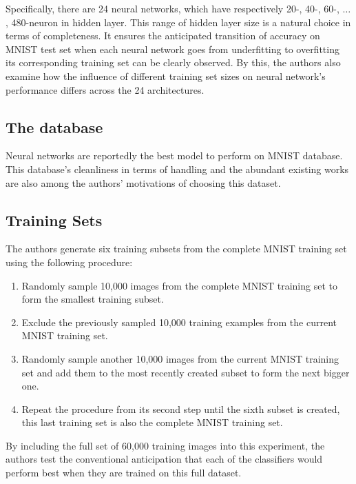 \documentclass[conference]{IEEEtran}
\begin{document}
Specifically, there are 24 neural networks, which have respectively 20-, 40-, 60-, $\ldots$, 480-neuron in hidden layer. This range of hidden layer size is a natural choice in terms of completeness. It ensures the anticipated transition of accuracy on MNIST test set when each neural network goes from underfitting to overfitting its corresponding training set can be clearly observed. By this, the authors also examine how the influence of different training set sizes on neural network's performance differs across the 24 architectures.
\subsection{The database}
Neural networks are reportedly the best model to perform on MNIST database. This database's cleanliness in terms of handling and the abundant existing works are also among the authors' motivations of choosing this dataset.
\subsection{Training Sets}
The authors generate six training subsets from the complete MNIST training set using the following procedure:
\begin{enumerate}
\item Randomly sample 10,000 images from the complete MNIST training set to form the smallest training subset.
\item Exclude the previously sampled 10,000 training examples from the current MNIST training set.
\item Randomly sample another 10,000 images from the current MNIST training set and add them to the most recently created subset to form the next bigger one.
\item Repeat the procedure from its second step until the sixth subset is created, this last training set is also the complete MNIST training set.
\end{enumerate}
By including the full set of 60,000 training images into this experiment, the authors test the conventional anticipation that each of the classifiers would perform best when they are trained on this full dataset.
\end{document}
